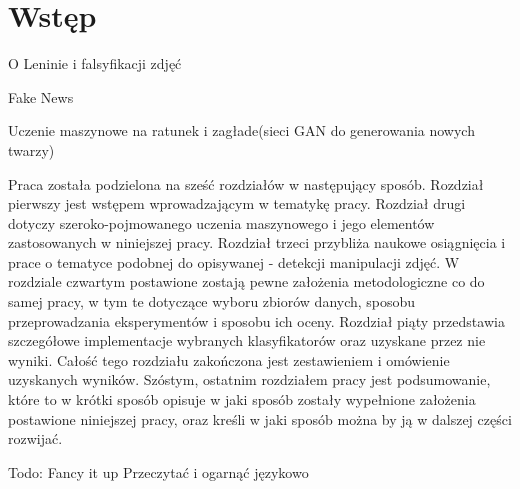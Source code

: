 \chapter{Wstęp}

O Leninie i falsyfikacji zdjęć

Fake News

Uczenie maszynowe na ratunek i zagłade(sieci GAN do generowania nowych twarzy)

Praca została podzielona na sześć rozdziałów w następujący sposób. Rozdział pierwszy jest wstępem wprowadzającym w tematykę pracy. Rozdział drugi dotyczy szeroko-pojmowanego uczenia maszynowego i jego elementów zastosowanych w niniejszej pracy. Rozdział trzeci przybliża naukowe osiągnięcia i prace o tematyce podobnej do opisywanej - detekcji manipulacji zdjęć. W rozdziale czwartym postawione zostają pewne założenia metodologiczne co do samej pracy, w tym te dotyczące wyboru zbiorów danych, sposobu przeprowadzania eksperymentów i sposobu ich oceny. Rozdział piąty przedstawia szczegółowe implementacje wybranych klasyfikatorów oraz uzyskane przez nie wyniki. Całość tego rozdziału zakończona jest zestawieniem i omówienie uzyskanych wyników. Szóstym, ostatnim rozdziałem pracy jest podsumowanie, które to w krótki sposób opisuje w jaki sposób zostały wypełnione założenia postawione niniejszej pracy, oraz kreśli w jaki sposób można by ją w dalszej części rozwijać.

Todo:
	Fancy it up
	Przeczytać i ogarnąć językowo